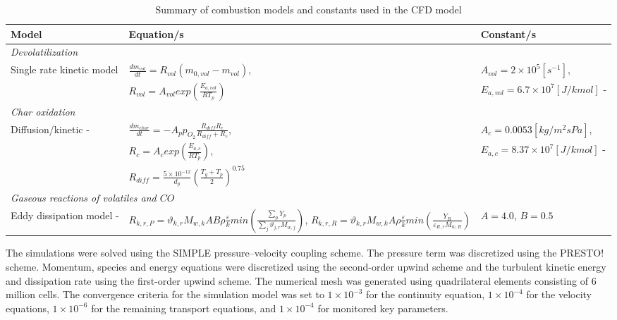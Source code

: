 \documentclass[a4paper,fleqn]{cas-sc}
\begin{document}
\begin{table}[h!]
\caption{Summary of combustion models and constants used in the CFD model}\label{tbl_combust}
\begin{tabular*}{\tblwidth}{p{}p{}p{}}
\toprule
Model & Equation/s & Constant/s\\
\midrule
\multicolumn{3}{l}{\textit{Devolatilization}} \\ %
Single rate kinetic model &$\frac{dm_{vol}}{dt} = R_{vol}(m_{0,vol}-m_{vol})$,  & $A_{vol} = 2\times10^5 [s^{-1}]$, \\
& $R_{vol} = A_{vol}exp\left(\frac{E_{a,vol}}{RT_p}\right)$ & $ E_{a,vol} = 6.7\times10^7 [J/kmol]$ - \cite{Sheng2004} \\
\multicolumn{3}{l}{\textit{Char oxidation}} \\
Diffusion/kinetic - \citep{Baum1971} & $\frac{dm_{char}}{dt} = -A_p p_{O_{2}} \frac{R_{diff}R_c}{R_{diff} + R_c}$,  & $A_{c} = 0.0053 [kg/m^2sPa]$, \\
& $R_{c} = A_{c}exp\left(\frac{E_{a,c}}{RT_p}\right)$,  & $E_{a,c} = 8.37\times10^7 [J/kmol]$ - \cite{Sheng2004} \\
& $R_{diff} = \frac{5\times10^{-12}}{d_p} \left(\frac{T_g+T_p}{2}\right)^{0.75}$&\\
\multicolumn{3}{l}{\textit{Gaseous reactions of volatiles and $CO$}} \\
Eddy dissipation model - \cite{Ansys} & $R_{k,r,P} =\vartheta_{k,r}M_{w,k}AB\rho\frac{\varepsilon}{k}min\left(\frac{\sum_{p} Y_p}{\sum_{j}\vartheta_{j,r}M_{w,j}}\right)$, $R_{k,r,R} =\vartheta_{k,r}M_{w,k}A\rho\frac{\varepsilon}{k}min\left(\frac{Y_R}{\varepsilon_{R,r}M_{w,R}}\right)$ & $A=4.0$, $B=0.5$\\
\bottomrule
\end{tabular*}
\end{table}

The simulations were solved using the SIMPLE pressure–velocity coupling scheme. The pressure term was discretized using the PRESTO! scheme. Momentum, species and energy equations were discretized using the second-order upwind scheme and the turbulent kinetic energy and dissipation rate using the first-order upwind scheme. The numerical mesh was generated using quadrilateral elements consisting of 6 million cells.  The convergence criteria for the simulation model was set to $1\times10^{-3}$ for the continuity equation, $1\times10^{-4}$ for the velocity equations, $1\times10^{-6}$ for the remaining transport equations, and $1\times10^{-4}$ for monitored key parameters.
\end{document}

